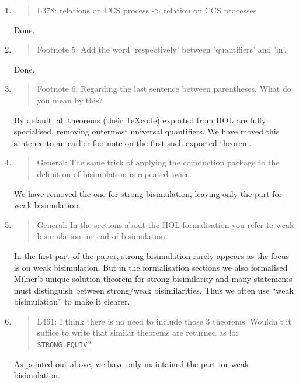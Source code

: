 \begin{enumerate}
\item \begin{quote}
    L378: relations on CCS process -> relation on CCS processes
  \end{quote}
  Done.
  
\item \begin{quote}
    Footnote 5: Add the word 'respectively' between 'quantifiers' and 'in'.
  \end{quote}
  Done.
  
\item \begin{quote}
    Footnote 6: Regarding the last sentence between parentheses. What do you mean by this?
  \end{quote}
  By default, all theorems (their \TeX code) exported from HOL are
  fully specialised, removing outermost universal quantifiers. We have
  moved this sentence to an earlier footnote on the first such exported theorem.

  
\item \begin{quote}
    General: The same trick of applying the coinduction package to the
    definition of bisimulation is repeated twice.
  \end{quote}
  We have removed the one for strong bisimulation, leaving
  only the part for weak bisimulation.
  
\item \begin{quote}
    General: In the sections about the HOL formalisation you refer to
    weak bisimulation instead of bisimulation.    
  \end{quote}
  In the first part of the paper, strong bisimulation rarely appears
  as the focus is on weak bisimulation. But in the formalisation
  sections we also formalised Milner's unique-solution theorem for
  strong bisimilarity and many statements must distinguish between
  strong/weak bisimilarities. Thus we often use ``weak bisimulation''
  to make it  clearer. 
  
\item \begin{quote}
    L461: I think there is no need to include those 3
    theorems. Wouldn’t it suffice to write that similar theorems are
    returned as for \texttt{STRONG\_EQUIV}?
  \end{quote}
As pointed out above, we have  only maintained 
 the part for weak bisimulation.
  

\end{enumerate}
